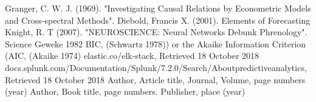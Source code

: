 %




\begin{thebibliography}{}
%
%
    Granger, C. W. J. (1969). "Investigating Causal Relations by Econometric Models and Cross-spectral Methods".
    Diebold, Francis X. (2001). Elements of Forecasting
     Knight, R. T (2007). "NEUROSCIENCE: Neural Networks Debunk Phrenology". Science
    Geweke 1982    
    BIC, (Schwartz 1978)) or the Akaike Information Criterion (AIC, (Akaike 1974)
    elastic.co/elk-stack, Retrieved 18 October 2018
    docs.splunk.com/Documentation/Splunk/7.2.0/Search/Aboutpredictiveanalytics, Retrieved 18 October 2018
Author, Article title, Journal, Volume, page numbers (year)
Author, Book title, page numbers. Publisher, place (year)
\end{thebibliography}



